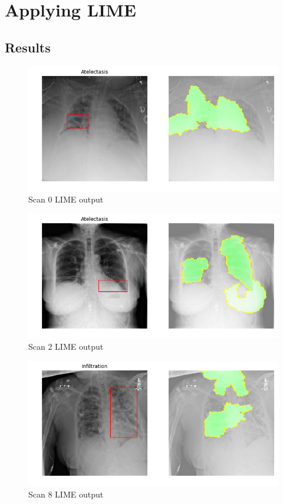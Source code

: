 \section{Applying LIME}


\subsection{Results}
\begin{figure}[!htb]
\centering
\caption{Scan 0 LIME output}
\includegraphics[width=12cm]{chapters/03_classification/images/lime_0.png}
\end{figure}

\begin{figure}[!htb]
\centering
\caption{Scan 2 LIME output}
\includegraphics[width=12cm]{chapters/03_classification/images/lime_2.png}
\end{figure}

\begin{figure}[!htb]
\centering
\caption{Scan 8 LIME output}
\includegraphics[width=12cm]{chapters/03_classification/images/lime_8.png}
\end{figure}

